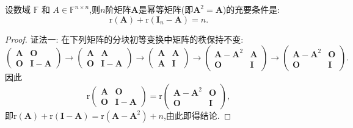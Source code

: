 \documentclass[../../main.tex]{subfiles}
\begin{document}
\begin{proposition}[幂等矩阵关于秩的判定准则]\label{proposition:幂等矩阵关于秩的判定准则}
设数域 $\mathbb{F}$ 和 $A \in \mathbb{F}^{n \times n}$,则\(n\)阶矩阵\(\boldsymbol{A}\)是幂等矩阵(即\(\boldsymbol{A}^2 = \boldsymbol{A}\))的充要条件是:
\[
\mathrm{r}(\boldsymbol{A})+\mathrm{r}(\boldsymbol{I}_n - \boldsymbol{A}) = n.
\]
\end{proposition}
\begin{proof}
{\color{blue}证法一:}
在下列矩阵的分块初等变换中矩阵的秩保持不变:
\[
\begin{pmatrix}
\boldsymbol{A}&\boldsymbol{O}\\
\boldsymbol{O}&\boldsymbol{I}-\boldsymbol{A}
\end{pmatrix}\to
\begin{pmatrix}
\boldsymbol{A}&\boldsymbol{A}\\
\boldsymbol{O}&\boldsymbol{I}-\boldsymbol{A}
\end{pmatrix}\to
\begin{pmatrix}
\boldsymbol{A}&\boldsymbol{A}\\
\boldsymbol{A}&\boldsymbol{I}
\end{pmatrix}\to
\begin{pmatrix}
\boldsymbol{A}-\boldsymbol{A}^2&\boldsymbol{A}\\
\boldsymbol{O}&\boldsymbol{I}
\end{pmatrix}\to
\begin{pmatrix}
\boldsymbol{A}-\boldsymbol{A}^2&\boldsymbol{O}\\
\boldsymbol{O}&\boldsymbol{I}
\end{pmatrix}.
\]
因此
\[
\mathrm{r}\begin{pmatrix}
\boldsymbol{A}&\boldsymbol{O}\\
\boldsymbol{O}&\boldsymbol{I}-\boldsymbol{A}
\end{pmatrix}=\mathrm{r}\begin{pmatrix}
\boldsymbol{A}-\boldsymbol{A}^2&\boldsymbol{O}\\
\boldsymbol{O}&\boldsymbol{I}
\end{pmatrix},
\]
即\(\mathrm{r}(\boldsymbol{A})+\mathrm{r}(\boldsymbol{I}-\boldsymbol{A})=\mathrm{r}(\boldsymbol{A}-\boldsymbol{A}^2)+n\),由此即得结论.


\end{proof}
\end{document}
